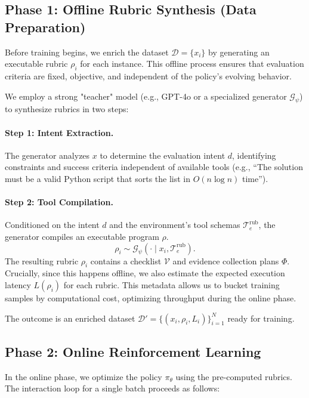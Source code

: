 \subsection{Phase 1: Offline Rubric Synthesis (Data Preparation)}
\label{sec:offline_synthesis}

Before training begins, we enrich the dataset $\mathcal{D} = \{x_i\}$ by generating an executable rubric $\rho_i$ for each instance. This offline process ensures that evaluation criteria are fixed, objective, and independent of the policy's evolving behavior.

We employ a strong "teacher" model (e.g., GPT-4o or a specialized generator $\mathcal{G}_\psi$) to synthesize rubrics in two steps:

\paragraph{Step 1: Intent Extraction.}
The generator analyzes $x$ to determine the evaluation intent $d$, identifying constraints and success criteria independent of available tools (e.g., ``The solution must be a valid Python script that sorts the list in $O(n \log n)$ time'').

\paragraph{Step 2: Tool Compilation.}
Conditioned on the intent $d$ and the environment's tool schemas $\mathcal{T}_e^{\text{rub}}$, the generator compiles an executable program $\rho$.
\begin{equation}
\rho_i \sim \mathcal{G}_\psi(\cdot \mid x_i, \mathcal{T}_e^{\text{rub}}).
\end{equation}
The resulting rubric $\rho_i$ contains a checklist $\mathcal{V}$ and evidence collection plans $\Phi$.
Crucially, since this happens offline, we also estimate the expected execution latency $L(\rho_i)$ for each rubric. This metadata allows us to bucket training samples by computational cost, optimizing throughput during the online phase.

The outcome is an enriched dataset $\mathcal{D}' = \{(x_i, \rho_i, L_i)\}_{i=1}^N$ ready for training.

\subsection{Phase 2: Online Reinforcement Learning}
\label{sec:online_training}

In the online phase, we optimize the policy $\pi_\theta$ using the pre-computed rubrics. The interaction loop for a single batch proceeds as follows:

